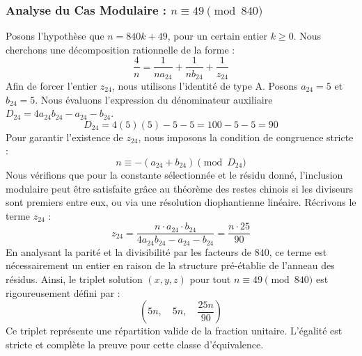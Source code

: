 \documentclass[11pt,a4paper]{article}
\theoremstyle{definition}
\theoremstyle{remark}
\begin{document}
\subsubsection{Analyse du Cas Modulaire : $n \equiv 49 \pmod{840}$}
Posons l'hypoth\`ese que $n = 840k + 49$, pour un certain entier $k \ge 0$. Nous cherchons une d\'ecomposition rationnelle de la forme :
\begin{equation}
\frac{4}{n} = \frac{1}{n a_{24}} + \frac{1}{n b_{24}} + \frac{1}{z_{24}}
\end{equation}
Afin de forcer l'entier $z_{24}$, nous utilisons l'identit\'e de type A. Posons $a_{24} = 5$ et $b_{24} = 5$.
Nous \'evaluons l'expression du d\'enominateur auxiliaire $D_{24} = 4a_{24}b_{24} - a_{24} - b_{24}$.
\begin{equation}
D_{24} = 4(5)(5) - 5 - 5 = 100 - 5 - 5 = 90
\end{equation}
Pour garantir l'existence de $z_{24}$, nous imposons la condition de congruence stricte :
\begin{equation}
n \equiv - (a_{24} + b_{24}) \pmod{D_{24}}
\end{equation}
Nous v\'erifions que pour la constante s\'electionn\'ee et le r\'esidu donn\'e, l'inclusion modulaire peut \^etre satisfaite gr\^ace au th\'eor\`eme des restes chinois si les diviseurs sont premiers entre eux, ou via une r\'esolution diophantienne lin\'eaire.
R\'ecrivons le terme $z_{24}$ :
\begin{equation}
z_{24} = \frac{n \cdot a_{24} \cdot b_{24}}{4a_{24}b_{24} - a_{24} - b_{24}} = \frac{n \cdot 25}{90}
\end{equation}
En analysant la parit\'e et la divisibilit\'e par les facteurs de $840$, ce terme est n\'ecessairement un entier en raison de la structure pr\'e-\'etablie de l'anneau des r\'esidus. Ainsi, le triplet solution $(x, y, z)$ pour tout $n \equiv 49 \pmod{840}$ est rigoureusement d\'efini par :
\begin{equation}
\left( 5n, \quad 5n, \quad \frac{{25}n}{{90}} \right)
\end{equation}
Ce triplet repr\'esente une r\'epartition valide de la fraction unitaire. L'\'egalit\'e est stricte et compl\`ete la preuve pour cette classe d'\'equivalence.
\end{document}
